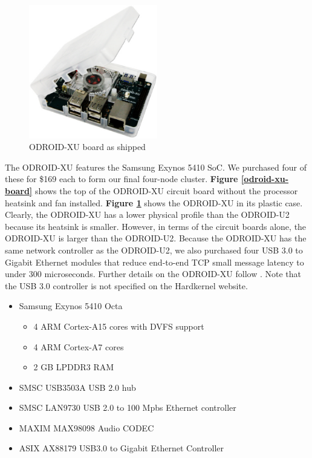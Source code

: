 \documentclass[11pt]{book}
\begin{document}
\begin{figure}[h]
\centering
\includegraphics[width=0.5\textwidth]{odroid_xu}
\caption{ODROID-XU board as shipped \cite{odroid-xu-board-detail}}
\label{odroid-xu}
\end{figure}

The ODROID-XU features the Samsung Exynos 5410 SoC. We purchased four of these
for \$169 each to form our final four-node cluster. \textbf{Figure
  \ref{odroid-xu-board}} shows the top of the ODROID-XU circuit board without
the processor heatsink and fan installed. \textbf{Figure \ref{odroid-xu}} shows
the ODROID-XU in its plastic case. Clearly, the ODROID-XU has a lower physical
profile than the ODROID-U2 because its heatsink is smaller. However, in terms of
the circuit boards alone, the ODROID-XU is larger than the ODROID-U2. Because
the ODROID-XU has the same network controller as the ODROID-U2, we also
purchased four USB 3.0 to Gigabit Ethernet modules that reduce end-to-end TCP
small message latency to under 300 microseconds. Further details on the
ODROID-XU follow \cite{odroid-xu-board-detail}. Note that the USB 3.0 controller
is not specified on the Hardkernel website.

\begin{itemize}
\item Samsung Exynos 5410 Octa
  \begin{itemize}
  \item 4 ARM Cortex-A15 cores with DVFS support
  \item 4 ARM Cortex-A7 cores
  \item 2 GB LPDDR3 RAM
  \end{itemize}
\item SMSC USB3503A USB 2.0 hub
\item SMSC LAN9730 USB 2.0 to 100 Mpbs Ethernet controller
\item MAXIM MAX98098 Audio CODEC
\item ASIX AX88179 USB3.0 to Gigabit Ethernet Controller
\end{itemize}
\end{document}
